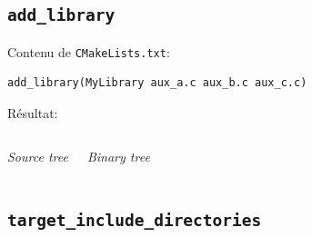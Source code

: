 \documentclass{beamer}
\newenvironment{Frame}{\begin{frame}[containsverbatim]{\subsecname}}{\end{frame}}
\begin{document}
\subsection{\texttt{add\_library}}

\begin{Frame}
    \setlength{\DTbaselineskip}{1em}
    Contenu de \texttt{CMakeLists.txt}:
    \begin{verbatim}
add_library(MyLibrary aux_a.c aux_b.c aux_c.c)
    \end{verbatim}

    Résultat:
    \begin{columns}
        \begin{center}   
            \textit{Source tree}
        \end{center}
        
        \begin{center}   
            \textit{Binary tree}
        \end{center}
    \end{columns}
\end{Frame}

\subsection{\texttt{target\_include\_directories}}
\end{document}
